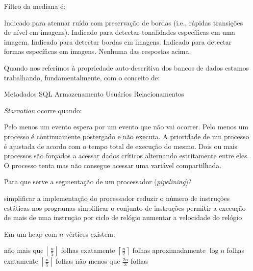 \documentclass[12pt, addpoints]{exam}
\begin{document}
    \begin{questions}

    \newpage
    \question
Filtro da mediana é:
\begin{choices}
\choice Indicado para atenuar ruído com preservação de bordas (i.e., rápidas transições de nível em imagens).
\choice Indicado para detectar tonalidades específicas em uma imagem.
\choice Indicado para detectar bordas em imagens.
\choice Indicado para detectar formas específicas em imagens.
\choice Nenhuma das respostas acima.
\end{choices}

\question
Quando nos referimos à propriedade auto-descritiva dos bancos de dados estamos
trabalhando, fundamentalmente, com o conceito de:
\begin{choices}
\choice Metadados
\choice SQL
\choice Armazenamento
\choice Usuários
\choice Relacionamentos
\end{choices}

\question
\textit{Starvation} ocorre quando:
\begin{choices}
\choice Pelo menos um evento espera por um evento que não vai ocorrer.
\choice Pelo menos um processo é continuamente postergado e não executa.
\choice A prioridade de um processo é ajustada de acordo com o tempo total de execução do mesmo.
\choice Dois ou mais processos são forçados a acessar dados críticos alternando estritamente entre eles.
\choice O processo tenta mas não consegue acessar uma variável compartilhada.
\end{choices}

\question
Para que serve a segmentação de um processador (\textit{pipelining})?
\begin{choices}
\choice simplificar a implementação do processador
\choice reduzir o número de instruções estáticas nos programas
\choice simplificar o conjunto de instruções
\choice permitir a execução de mais de uma instrução por ciclo de relógio
\choice aumentar a velocidade do relógio
\end{choices}

\question
Em um heap com \( n \) vértices existem:
\begin{choices}
\choice não mais que \( \left\lfloor \frac{n}{5} \right\rfloor \) folhas
\choice exatamente \( \left\lceil \frac{n}{2} \right\rceil \) folhas
\choice aproximadamente \( \log n \) folhas
\choice exatamente \( \left\lceil \frac{n}{5} \right\rceil \) folhas
\choice não menos que \( \frac{2n}{3} \) folhas
\end{choices}


\end{questions}
\end{document}
